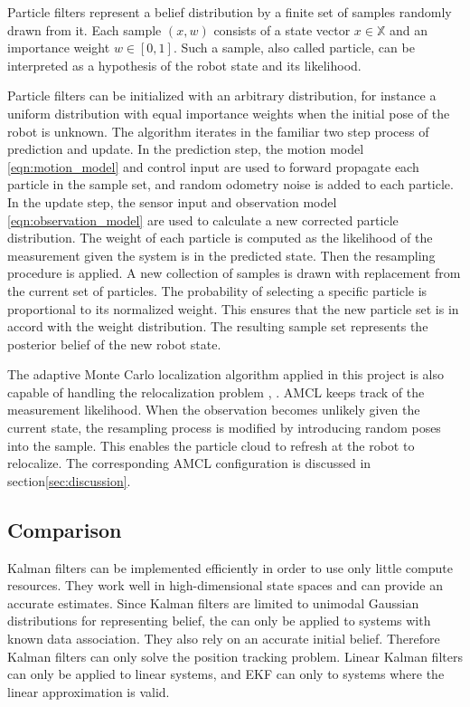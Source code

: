 \documentclass[10pt,journal,compsoc]{IEEEtran}
\begin{document}
Particle filters represent a belief distribution by a finite set of samples randomly drawn from it. Each sample $(x, w)$ consists of a state vector $x \in \mathbb{X}$ and an importance weight $w \in [0,1]$. Such a sample, also called particle, can be interpreted as a hypothesis of the robot state and its likelihood. 

Particle filters can be initialized with an arbitrary distribution, for instance a uniform distribution with equal importance weights when the initial pose of the robot is unknown. The algorithm iterates in the familiar two step process of prediction and update. In the prediction step, the motion model \ref{eqn:motion_model} and control input are used to forward propagate each particle in the sample set, and random odometry noise is added to each particle. In the update step, the sensor input and observation model \ref{eqn:observation_model} are used to calculate a new corrected particle distribution. The weight of each particle is computed as the likelihood of the measurement given the system is in the predicted state. Then the resampling procedure is applied. A new collection of samples is drawn with replacement from the current set of particles. The probability of selecting a specific particle is proportional to its normalized weight. This ensures that the new particle set is in accord with the weight distribution. The resulting sample set represents the posterior belief of the new robot state.

The adaptive Monte Carlo localization algorithm applied in this project is also capable of handling the relocalization problem \cite{probabilistic_robotics}, \cite{ros_wiki_amcl}. AMCL keeps track of the measurement likelihood. When the observation becomes unlikely given the current state, the resampling process is modified by introducing random poses into the sample. This enables the particle cloud to refresh at the robot to relocalize. The corresponding AMCL configuration is discussed in section\ref{sec:discussion}.

\subsection{Comparison}
Kalman filters can be implemented efficiently in order to use only little compute resources. They work well in high-dimensional state spaces and can provide an accurate estimates. Since Kalman filters are limited to unimodal Gaussian distributions for representing belief, the can only be applied to systems with known data association. They also rely on an accurate initial belief. Therefore Kalman filters can only solve the position tracking problem. Linear Kalman filters can only be applied to linear systems, and EKF can only to systems where the linear approximation is valid. 
\end{document}

